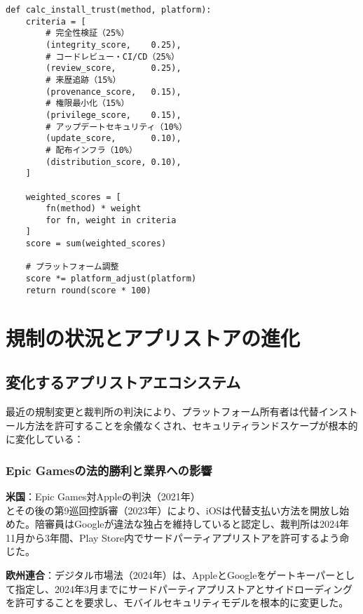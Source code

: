 \documentclass[Specialissue]{jsaiart}
\begin{document}
\begin{small}
\begin{verbatim}
def calc_install_trust(method, platform):
    criteria = [
        # 完全性検証（25%）
        (integrity_score,    0.25),
        # コードレビュー・CI/CD（25%）
        (review_score,       0.25),
        # 来歴追跡（15%）
        (provenance_score,   0.15),
        # 権限最小化（15%）
        (privilege_score,    0.15),
        # アップデートセキュリティ（10%）
        (update_score,       0.10),
        # 配布インフラ（10%）
        (distribution_score, 0.10),
    ]

    weighted_scores = [
        fn(method) * weight
        for fn, weight in criteria
    ]
    score = sum(weighted_scores)

    # プラットフォーム調整
    score *= platform_adjust(platform)
    return round(score * 100)
\end{verbatim}
\end{small}

\section{規制の状況とアプリストアの進化}

\subsection{変化するアプリストアエコシステム}

最近の規制変更と裁判所の判決により、プラットフォーム所有者は代替インストール方法を許可することを余儀なくされ、セキュリティランドスケープが根本的に変化している\cite{uk2024cma,india2024antitrust}：

\subsubsection{Epic Gamesの法的勝利と業界への影響}

\textbf{米国}：Epic Games対Appleの判決（2021年）\cite{epic2021ruling}とその後の第9巡回控訴審（2023年）\cite{epic2024appeal}により、iOSは代替支払い方法を開放し始めた。陪審員はGoogleが違法な独占を維持していると認定し、裁判所は2024年11月から3年間、Play Store内でサードパーティアプリストアを許可するよう命じた。

\textbf{欧州連合}：デジタル市場法（2024年）\cite{eu2024dma}は、AppleとGoogleをゲートキーパーとして指定し、2024年3月までにサードパーティアプリストアとサイドローディングを許可することを要求し、モバイルセキュリティモデルを根本的に変更した。
\end{document}
